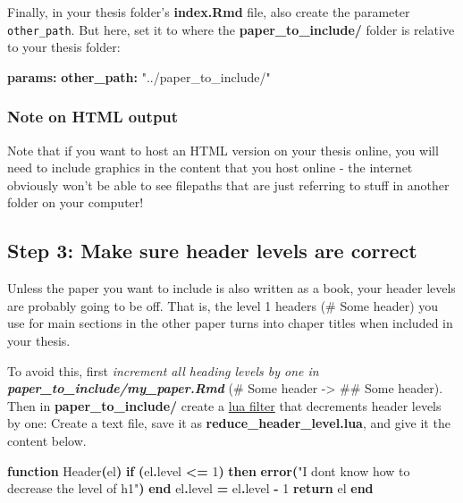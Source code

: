 \documentclass[a4paper, nobind]{templates/ociamthesis}
\newenvironment{Shaded}{\begin{snugshade}}{\end{snugshade}}
\newcommand{\AttributeTok}[1]{\textcolor[rgb]{0.13,0.29,0.53}{#1}}
\newcommand{\ControlFlowTok}[1]{\textcolor[rgb]{0.13,0.29,0.53}{\textbf{#1}}}
\newcommand{\DecValTok}[1]{\textcolor[rgb]{0.00,0.00,0.81}{#1}}
\newcommand{\FunctionTok}[1]{\textcolor[rgb]{0.13,0.29,0.53}{\textbf{#1}}}
\newcommand{\KeywordTok}[1]{\textcolor[rgb]{0.13,0.29,0.53}{\textbf{#1}}}
\newcommand{\NormalTok}[1]{#1}
\newcommand{\OperatorTok}[1]{\textcolor[rgb]{0.81,0.36,0.00}{\textbf{#1}}}
\newcommand{\StringTok}[1]{\textcolor[rgb]{0.31,0.60,0.02}{#1}}
\newcommand{\VariableTok}[1]{\textcolor[rgb]{0.00,0.00,0.00}{#1}}
\renewenvironment{Shaded}
{
  \vspace{10pt}%
  \begin{snugshade}%
}{%
  \end{snugshade}%
  \vspace{8pt}%
}
\begin{document}
Finally, in your thesis folder's \textbf{index.Rmd} file, also create the parameter \texttt{other\_path}.
But here, set it to where the \textbf{paper\_to\_include/} folder is relative to your thesis folder:

\begin{Shaded}
\begin{Highlighting}[]
\FunctionTok{params}\KeywordTok{:}
\AttributeTok{  }\FunctionTok{other\_path}\KeywordTok{:}\AttributeTok{ }\StringTok{"../paper\_to\_include/"}
\end{Highlighting}
\end{Shaded}

\subsubsection{Note on HTML output}\label{note-on-html-output}

Note that if you want to host an HTML version on your thesis online, you will need to include graphics in the content that you host online - the internet obviously won't be able to see filepaths that are just referring to stuff in another folder on your computer!

\subsection{Step 3: Make sure header levels are correct}\label{step-3-make-sure-header-levels-are-correct}

Unless the paper you want to include is also written as a book, your header levels are probably going to be off.
That is, the level 1 headers (\# Some header) you use for main sections in the other paper turns into chaper titles when included in your thesis.

To avoid this, first \emph{increment all heading levels by one in \textbf{paper\_to\_include/my\_paper.Rmd}} (\# Some header -\textgreater{} \#\# Some header).
Then in \textbf{paper\_to\_include/} create a \href{https://bookdown.org/yihui/rmarkdown-cookbook/lua-filters.html\#lua-filters}{lua filter} that decrements header levels by one: Create a text file, save it as \textbf{reduce\_header\_level.lua}, and give it the content below.

\begin{Shaded}
\begin{Highlighting}[]
\KeywordTok{function}\NormalTok{ Header}\OperatorTok{(}\VariableTok{el}\OperatorTok{)}
  \ControlFlowTok{if} \OperatorTok{(}\VariableTok{el}\OperatorTok{.}\VariableTok{level} \OperatorTok{\textless{}=} \DecValTok{1}\OperatorTok{)} \ControlFlowTok{then}
    \FunctionTok{error}\OperatorTok{(}\StringTok{"I don\textquotesingle{}t know how to decrease the level of h1"}\OperatorTok{)}
  \ControlFlowTok{end}
  \VariableTok{el}\OperatorTok{.}\VariableTok{level} \OperatorTok{=} \VariableTok{el}\OperatorTok{.}\VariableTok{level} \OperatorTok{{-}} \DecValTok{1}
  \ControlFlowTok{return} \VariableTok{el}
\KeywordTok{end}
\end{Highlighting}
\end{Shaded}
\end{document}
